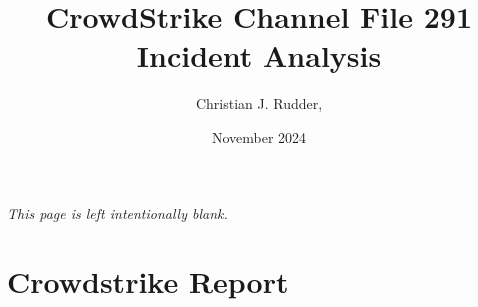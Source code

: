 \documentclass{memoir}
\title{CrowdStrike Channel File 291 Incident Analysis}
\author{Christian J. Rudder, }
\date{November 2024}
\begin{document}
\maketitle
\setcounter{tocdepth}{2}

\tableofcontents

\newpage
\thispagestyle{empty}
\mbox{}
\vfill
\begin{center}
    \textit{This page is left intentionally blank.}
\end{center}
\vfill
\newpage
\thispagestyle{empty}




\chapter{Crowdstrike Report}




\end{document}
